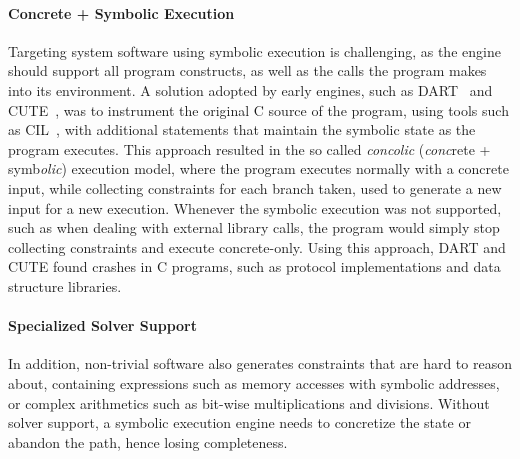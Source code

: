 \paragraph{Concrete + Symbolic Execution}

Targeting system software using symbolic execution is challenging, as the engine should support all program constructs, as well as the calls the program makes into its environment.
%
A solution adopted by early engines, such as DART~\cite{dart} and CUTE~\cite{cute}, was to instrument the original C source of the program, using tools such as CIL~\cite{cil}, with additional statements that maintain the symbolic state as the program executes.  This approach resulted in the so called \emph{concolic} (\emph{conc}rete + symb\emph{olic}) execution model, where the program executes normally with a concrete input, while collecting constraints for each branch taken, used to generate a new input for a new execution.
%
Whenever the symbolic execution was not supported, such as when dealing with external library calls, the program would simply stop collecting constraints and execute concrete-only.
%
Using this approach, DART and CUTE found crashes in C programs, such as protocol implementations and data structure libraries.


\paragraph{Specialized Solver Support}

In addition, non-trivial software also generates constraints that are hard to reason about, containing expressions such as memory accesses with symbolic addresses, or complex arithmetics such as bit-wise multiplications and divisions.  Without solver support, a symbolic execution engine needs to concretize the state or abandon the path, hence losing completeness.

